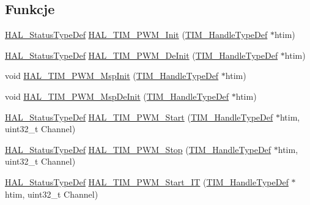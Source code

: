\subsection*{Funkcje}
\begin{DoxyCompactItemize}
\item 
\hyperlink{stm32f4xx__hal__def_8h_a63c0679d1cb8b8c684fbb0632743478f}{H\+A\+L\+\_\+\+Status\+Type\+Def} \hyperlink{group___t_i_m___exported___functions___group3_ga25824b2eed564cc37a8983b99a83bdc7}{H\+A\+L\+\_\+\+T\+I\+M\+\_\+\+P\+W\+M\+\_\+\+Init} (\hyperlink{struct_t_i_m___handle_type_def}{T\+I\+M\+\_\+\+Handle\+Type\+Def} $\ast$htim)
\item 
\hyperlink{stm32f4xx__hal__def_8h_a63c0679d1cb8b8c684fbb0632743478f}{H\+A\+L\+\_\+\+Status\+Type\+Def} \hyperlink{group___t_i_m___exported___functions___group3_ga5bb7b197ace5bab9ef120163ff1520bd}{H\+A\+L\+\_\+\+T\+I\+M\+\_\+\+P\+W\+M\+\_\+\+De\+Init} (\hyperlink{struct_t_i_m___handle_type_def}{T\+I\+M\+\_\+\+Handle\+Type\+Def} $\ast$htim)
\item 
void \hyperlink{group___t_i_m___exported___functions___group3_gaf94d3d2003a4eebed73744ccd5c85974}{H\+A\+L\+\_\+\+T\+I\+M\+\_\+\+P\+W\+M\+\_\+\+Msp\+Init} (\hyperlink{struct_t_i_m___handle_type_def}{T\+I\+M\+\_\+\+Handle\+Type\+Def} $\ast$htim)
\item 
void \hyperlink{group___t_i_m___exported___functions___group3_ga3abff1ab9a918c30db77c7890e6e2b07}{H\+A\+L\+\_\+\+T\+I\+M\+\_\+\+P\+W\+M\+\_\+\+Msp\+De\+Init} (\hyperlink{struct_t_i_m___handle_type_def}{T\+I\+M\+\_\+\+Handle\+Type\+Def} $\ast$htim)
\item 
\hyperlink{stm32f4xx__hal__def_8h_a63c0679d1cb8b8c684fbb0632743478f}{H\+A\+L\+\_\+\+Status\+Type\+Def} \hyperlink{group___t_i_m___exported___functions___group3_ga11da9bda53a5d21c293bb01da91e592d}{H\+A\+L\+\_\+\+T\+I\+M\+\_\+\+P\+W\+M\+\_\+\+Start} (\hyperlink{struct_t_i_m___handle_type_def}{T\+I\+M\+\_\+\+Handle\+Type\+Def} $\ast$htim, uint32\+\_\+t Channel)
\item 
\hyperlink{stm32f4xx__hal__def_8h_a63c0679d1cb8b8c684fbb0632743478f}{H\+A\+L\+\_\+\+Status\+Type\+Def} \hyperlink{group___t_i_m___exported___functions___group3_gae087011858379feeb770ecb4568829d3}{H\+A\+L\+\_\+\+T\+I\+M\+\_\+\+P\+W\+M\+\_\+\+Stop} (\hyperlink{struct_t_i_m___handle_type_def}{T\+I\+M\+\_\+\+Handle\+Type\+Def} $\ast$htim, uint32\+\_\+t Channel)
\item 
\hyperlink{stm32f4xx__hal__def_8h_a63c0679d1cb8b8c684fbb0632743478f}{H\+A\+L\+\_\+\+Status\+Type\+Def} \hyperlink{group___t_i_m___exported___functions___group3_gaca1f5fbc35101d0fc7e8af31c9a0c26c}{H\+A\+L\+\_\+\+T\+I\+M\+\_\+\+P\+W\+M\+\_\+\+Start\+\_\+\+IT} (\hyperlink{struct_t_i_m___handle_type_def}{T\+I\+M\+\_\+\+Handle\+Type\+Def} $\ast$htim, uint32\+\_\+t Channel)

\end{DoxyCompactItemize}
